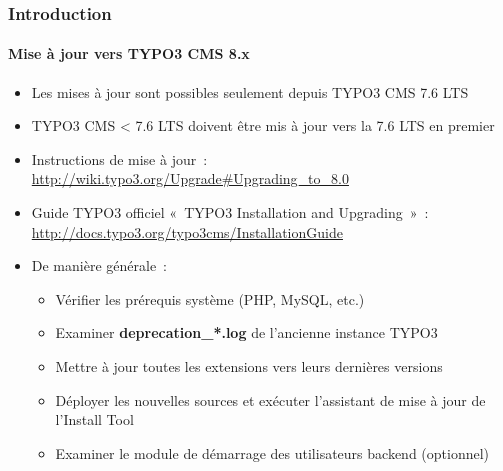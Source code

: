 \begin{frame}[fragile]
	\frametitle{Introduction}
	\framesubtitle{Mise à jour vers TYPO3 CMS 8.x}

	\begin{itemize}
		\item Les mises à jour sont possibles seulement depuis TYPO3 CMS 7.6 LTS
		\item TYPO3 CMS < 7.6 LTS doivent être mis à jour vers la 7.6 LTS en premier
	\end{itemize}

	\begin{itemize}

		\item Instructions de mise à jour~:\newline
			\smaller\url{http://wiki.typo3.org/Upgrade#Upgrading_to_8.0}\normalsize
		\item Guide TYPO3 officiel «~TYPO3 Installation and Upgrading~»~:
			\smaller\url{http://docs.typo3.org/typo3cms/InstallationGuide}\normalsize
		\item De manière générale~:
			\begin{itemize}
				\item Vérifier les prérequis système \small(PHP, MySQL, etc.)
				\item Examiner \textbf{deprecation\_*.log} de l'ancienne instance TYPO3
				\item Mettre à jour toutes les extensions vers leurs dernières versions
				\item Déployer les nouvelles sources et exécuter l'assistant de mise à jour de l'Install Tool
				\item Examiner le module de démarrage des utilisateurs backend (optionnel)
			\end{itemize}
	\end{itemize}

\end{frame}


